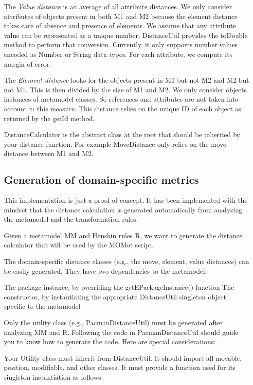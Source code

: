 The \emph{Value distance} is an average of all attribute distances. We only consider attributes of objects present in both M1 and M2 because the element distance takes care of absence and presence of elements. We assume that any attribute value can be represented as a unique number. DistanceUtil provides the toDouble method to perform that conversion. Currently, it only supports number values encoded as Number or String data types. For each attribute, we compute its margin of error.

The \emph{Element distance} looks for the objects present in M1 but not M2 and M2 but not M1. This is then divided by the size of M1 and M2. We only consider objects instances of metamodel classes. So references and attributes are not taken into account in this measure. This distance relies on the unique ID of each object as returned by the getId method.

DistanceCalculator is the abstract class at the root that should be inherited by your distance function. For example MoveDistance only relies on the move distance between M1 and M2.

\subsection{Generation of domain-specific metrics}

This implementation is just a proof of concept. It has been implemented with the mindset that the distance calculation is generated automatically from analyzing the metamodel and the transformation rules.

Given a metamodel MM and Henshin rules R, we want to generate the distance calculator that will be used by the MOMot script.

The domain-specific distance classes (e.g., the move, element, value distances) can be easily generated. They have two dependencies to the metamodel:

The package instance, by overriding the getEPackageInstance() function
The constructor, by instantiating the appropriate DistanceUtil singleton object specific to the metamodel

Only the utility class (e.g., PacmanDistanceUtil) must be generated after analyzing MM and R. Following the code in PacmanDistanceUtil should guide you to know how to generate the code. Here are special considerations:

Your Utility class must inherit from DistanceUtil.
It should import all movable, position, modifiable, and other classes.
It must provide a function used for its singleton instantiation as follows.

